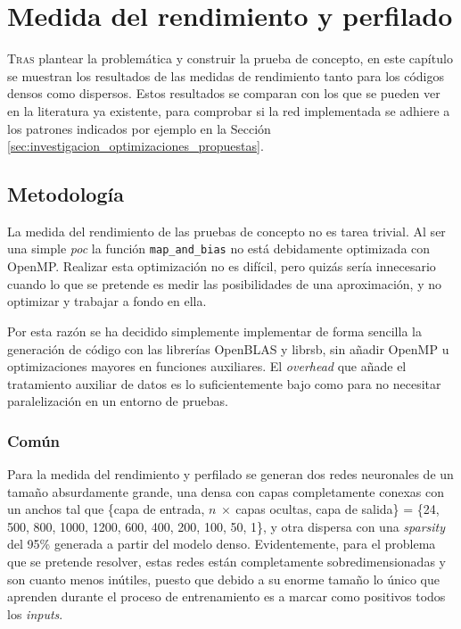 \chapter{Medida del rendimiento y perfilado}
\label{chap:medida_rendimiento_perfilado}

\lettrine{T}{ras} plantear la problemática y construir la prueba de concepto, en este capítulo se muestran los resultados de las medidas de rendimiento tanto para los códigos densos como dispersos. Estos resultados se comparan con los que se pueden ver en la literatura ya existente, para comprobar si la red implementada se adhiere a los patrones indicados por ejemplo en la Sección \ref{sec:investigacion_optimizaciones_propuestas}.

\section{Metodología}
\label{sec:metodologia}
La medida del rendimiento de las pruebas de concepto no es tarea trivial. Al ser una simple \textit{\acrlong{poc}} la función \texttt{map\_and\_bias} no está debidamente optimizada con OpenMP. Realizar esta optimización no es difícil, pero quizás sería innecesario cuando lo que se pretende es medir las posibilidades de una aproximación, y no optimizar y trabajar a fondo en ella.

Por esta razón se ha decidido simplemente implementar de forma sencilla la generación de código con las librerías OpenBLAS y librsb, sin añadir OpenMP u optimizaciones mayores en funciones auxiliares. El \textit{overhead} que añade el tratamiento auxiliar de datos es lo suficientemente bajo como para no necesitar paralelización en un entorno de pruebas.

\subsection{Común}
\label{ssec:comun_metodologia}
Para la medida del rendimiento y perfilado se generan dos redes neuronales de un tamaño absurdamente grande, una densa con capas completamente conexas con un anchos tal que \{capa de entrada, $n\:\times\:$capas ocultas, capa de salida\} = \{24, 500, 800, 1000, 1200, 600, 400, 200, 100, 50, 1\}, y otra dispersa con una \textit{sparsity} del 95\% generada a partir del modelo denso. Evidentemente, para el problema que se pretende resolver, estas redes están completamente sobredimensionadas y son cuanto menos inútiles, puesto que debido a su enorme tamaño lo único que aprenden durante el proceso de entrenamiento es a marcar como positivos todos los \textit{inputs}.

